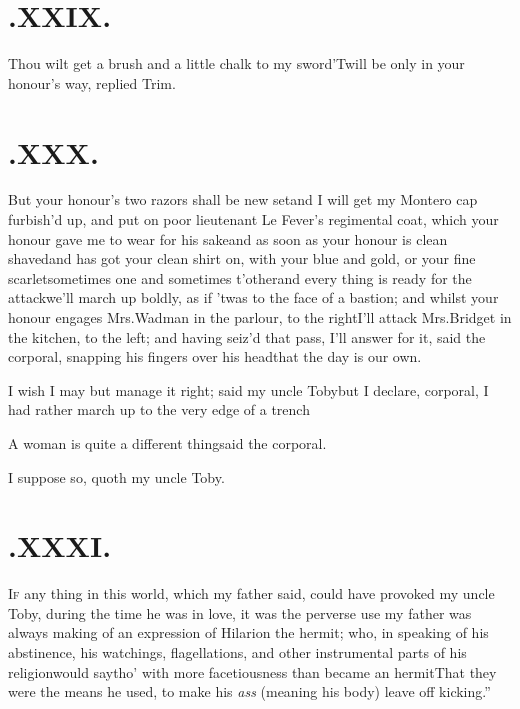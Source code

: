 \documentclass{article}
\begin{document}
\section{.\enspace XXIX.}

\quad\tsh Thou wilt get a brush and a little chalk to my
sword\tsh ’Twill be only in your honour’s way,
replied Trim.

\section{.\enspace XXX.}

\quad\tsk But your honour’s two razors shall be new
set\tsk and I will get my Montero cap furbish’d up,
and put on poor lieutenant Le Fever’s regimental coat,
which your honour gave me to\pb 
wear for his sake\tsk and as soon as your honour is clean
shaved\tsk and has got your clean shirt on, with your blue and
gold, or your fine scarlet\tsh sometimes one and sometimes
t’other\tsk and every thing is ready for the attack\tsk we’ll
march up boldly, as if ’twas to the face of a bastion; and
whilst your honour engages Mrs.\@  Wadman in the parlour, to the
right\tsh I’ll attack Mrs.\@ Bridget in the kitchen, to the
left; and having seiz’d that pass, I’ll answer for it, said the
corporal, snapping his fingers over his head\break\tsk that the
day is our own.

I wish I may but manage it right; said my uncle
Toby\tsk but I declare, corporal, I had rather march up to
the very edge of a trench\tsh

\newpage
\tsk A woman is quite a different thing\break\tsk said the
corporal.

\tsk I suppose so, quoth my uncle Toby.

\section{.\enspace XXXI.}

\lettrine{I}{f} any thing in this world, which my\break
father said, could have provoked my uncle Toby, during the
time he was in love, it was the perverse use my father was always
making of an expression of Hilarion the hermit; who, in
speaking of his abstinence, his watchings, flagellations, and other
instrumental parts of his religion\tsk would say\tsk tho’
with more facetiousness than became an
hermit\tsk \lqq That they were the means he used, to make
his \textit{ass} (meaning his body) leave off kicking.”
\end{document}
